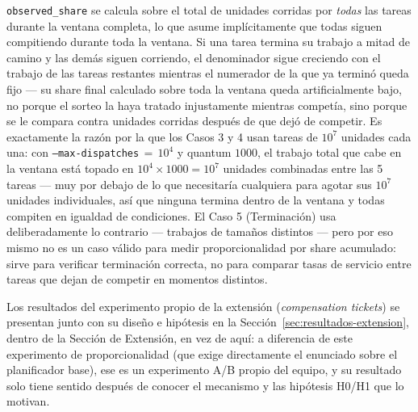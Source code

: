 \texttt{observed\_share} se calcula sobre el total de unidades corridas por
\emph{todas} las tareas durante la ventana completa, lo que asume
implícitamente que todas siguen compitiendo durante toda la ventana. Si una
tarea termina su trabajo a mitad de camino y las demás siguen corriendo, el
denominador sigue creciendo con el trabajo de las tareas restantes mientras
el numerador de la que ya terminó queda fijo --- su share final calculado
sobre toda la ventana queda artificialmente bajo, no porque el sorteo la
haya tratado injustamente mientras competía, sino porque se le compara
contra unidades corridas después de que dejó de competir. Es exactamente
la razón por la que los Casos 3 y 4 usan tareas de $10^7$ unidades cada
una: con \texttt{--max-dispatches}$\,{=}\,10^4$ y quantum $1000$, el trabajo
total que cabe en la ventana está topado en $10^4 \times 1000 = 10^7$
unidades combinadas entre las 5 tareas --- muy por debajo de lo que
necesitaría cualquiera para agotar sus $10^7$ unidades individuales, así
que ninguna termina dentro de la ventana y todas compiten en igualdad de
condiciones. El Caso 5 (Terminación) usa deliberadamente lo contrario
--- trabajos de tamaños distintos --- pero por eso mismo no es un caso
válido para medir proporcionalidad por share acumulado: sirve para
verificar terminación correcta, no para comparar tasas de servicio entre
tareas que dejan de competir en momentos distintos.

Los resultados del experimento propio de la extensión (\textit{compensation
tickets}) se presentan junto con su diseño e hipótesis en la
Sección~\ref{sec:resultados-extension}, dentro de la Sección de Extensión,
en vez de aquí: a diferencia de este experimento de proporcionalidad (que
exige directamente el enunciado sobre el planificador base), ese es un
experimento A/B propio del equipo, y su resultado solo tiene sentido después
de conocer el mecanismo y las hipótesis H0/H1 que lo motivan.
